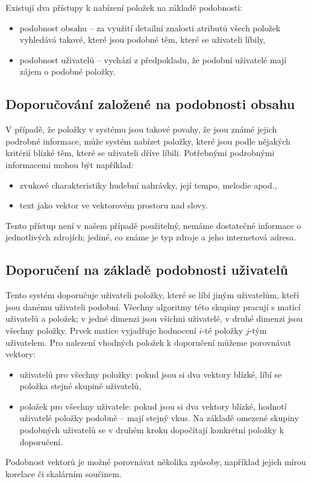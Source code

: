 Existují dva přístupy k nabízení položek na základě podobnosti:
\begin{itemize}
    \item podobnost obsahu -- za využití detailní znalosti atributů všech položek vyhledává takové, které jsou podobné těm, které se uživateli líbily,
    \item podobnost uživatelů -- vychází z předpokladu, že podobní uživatelé mají zájem o podobné položky.
\end{itemize}

\subsection{Doporučování založené na podobnosti obsahu}

V případě, že položky v systému jsou takové povahy, že jsou známé jejich podrobné informace, může systém nabízet položky, které jsou podle nějakých kritérií blízké těm, které se uživateli dříve líbili.
Potřebnými podrobnými informacemi mohou být například:
\begin{itemize}
    \item zvukové charakteristiky hudební nahrávky, její tempo, melodie apod.,
    \item text jako vektor ve vektorovém prostoru nad slovy.
\end{itemize}

Tento přístup není v našem případě použitelný, nemáme dostatečné informace o jednotlivých zdrojích; jediné, co známe je typ zdroje a jeho internetová adresa.

\subsection{Doporučení na základě podobnosti uživatelů}

Tento systém doporučuje uživateli položky, které se líbí jiným uživatelům, kteří jsou danému uživateli podobní.
Všechny algoritmy této skupiny pracují s maticí uživatelů a položek; v jedné dimenzi jsou všichni uživatelé, v druhé dimenzi jsou všechny položky.
Prvek matice vyjadřuje hodnocení $i$-té položky $j$-tým uživatelem.
Pro nalezení vhodných položek k doporučení můžeme porovnávat vektory:
\begin{itemize}
    \item uživatelů pro všechny položky: pokud jsou si dva vektory blízké, líbí se položka stejné skupině uživatelů,
    \item položek pro všechny uživatele: pokud jsou si dva vektory blízké, hodnotí uživatelé položky podobně -- mají stejný vkus.
        Na základě omezené skupiny podobných uživatelů se v druhém kroku dopočítají konkrétní položky k doporučení.
\end{itemize}
Podobnost vektorů je možné porovnávat několika způsoby, například jejich mírou korelace či skalárním součinem.

